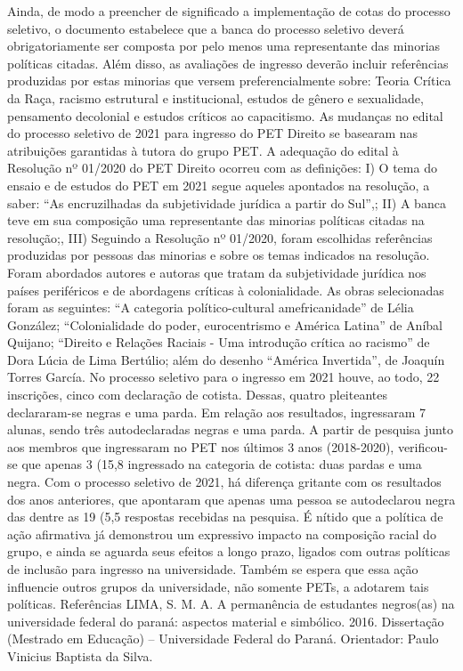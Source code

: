 Ainda, de modo a preencher de significado a implementação de cotas do processo
seletivo, o documento estabelece que a banca do processo seletivo deverá obrigatoriamente ser
composta por pelo menos uma representante das minorias políticas citadas. Além disso, as
avaliações de ingresso deverão incluir referências produzidas por estas minorias que versem
preferencialmente sobre: Teoria Crítica da Raça, racismo estrutural e institucional, estudos de
gênero e sexualidade, pensamento decolonial e estudos críticos ao capacitismo.
As mudanças no edital do processo seletivo de 2021 para ingresso do PET Direito se
basearam nas atribuições garantidas à tutora do grupo PET. A adequação do edital à Resolução
nº 01/2020 do PET Direito ocorreu com as definições: I) O tema do ensaio e de estudos do PET
em 2021 segue aqueles apontados na resolução, a saber: “As encruzilhadas da subjetividade
jurídica a partir do Sul”,; II) A banca teve em sua composição uma representante das minorias
políticas citadas na resolução;, III) Seguindo a Resolução nº 01/2020, foram escolhidas
referências produzidas por pessoas das minorias e sobre os temas indicados na resolução. Foram
abordados autores e autoras que tratam da subjetividade jurídica nos países periféricos e de
abordagens críticas à colonialidade. As obras selecionadas foram as seguintes: “A categoria
político-cultural amefricanidade” de Lélia González; “Colonialidade do poder, eurocentrismo e
América Latina” de Aníbal Quijano; “Direito e Relações Raciais - Uma introdução crítica ao
racismo” de Dora Lúcia de Lima Bertúlio; além do desenho “América Invertida”, de Joaquín
Torres García.
No processo seletivo para o ingresso em 2021 houve, ao todo, 22 inscrições, cinco com
declaração de cotista. Dessas, quatro pleiteantes declararam-se negras e uma parda. Em relação
aos resultados, ingressaram 7 alunas, sendo três autodeclaradas negras e uma parda. A partir de
pesquisa junto aos membros que ingressaram no PET nos últimos 3 anos (2018-2020),
verificou-se que apenas 3 (15,8%
ingressado na categoria de cotista: duas pardas e uma negra.
Com o processo seletivo de 2021, há diferença gritante com os resultados dos anos
anteriores, que apontaram que apenas uma pessoa se autodeclarou negra das dentre as 19 (5,5%
respostas recebidas na pesquisa. É nítido que a política de ação afirmativa já demonstrou um
expressivo impacto na composição racial do grupo, e ainda se aguarda seus efeitos a longo prazo,
ligados com outras políticas de inclusão para ingresso na universidade. Também se espera que
essa ação influencie outros grupos da universidade, não somente PETs, a adotarem tais políticas.
Referências
LIMA, S. M. A. A permanência de estudantes negros(as) na universidade federal do
paraná: aspectos material e simbólico. 2016. Dissertação (Mestrado em Educação) –
Universidade Federal do Paraná. Orientador: Paulo Vinicius Baptista da Silva.

